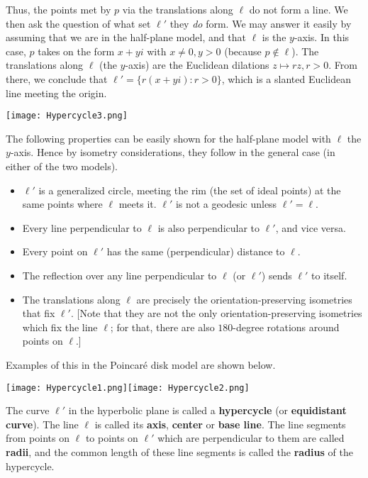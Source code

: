 \documentclass[leqno]{book}
\begin{document}
Thus, the points met by $p$ via the translations along $\ell$ do not form a line.  We then ask the question of what set $\ell'$ they \emph{do} form.  We may answer it easily by assuming that we are in the half-plane model, and that $\ell$ is the $y$-axis.  In this case, $p$ takes on the form $x+yi$ with $x\ne 0,y>0$ (because $p\notin\ell$).  The translations along $\ell$ (the $y$-axis) are the Euclidean dilations $z\mapsto rz,r>0$.  From there, we conclude that $\ell'=\{r(x+yi):r>0\}$, which is a slanted Euclidean line meeting the origin.
\begin{center}\texttt{[image: Hypercycle3.png]}\end{center}
The following properties can be easily shown for the half-plane model with $\ell$ the $y$-axis.  Hence by isometry considerations, they follow in the general case (in either of the two models).
\begin{itemize}
\item $\ell'$ is a generalized circle, meeting the rim (the set of ideal points) at the same points where $\ell$ meets it.  $\ell'$ is not a geodesic unless $\ell'=\ell$. %

\item Every line perpendicular to $\ell$ is also perpendicular to $\ell'$, and vice versa.

\item Every point on $\ell'$ has the same (perpendicular) distance to $\ell$.

\item The reflection over any line perpendicular to $\ell$ (or $\ell'$) sends $\ell'$ to itself.

\item The translations along $\ell$ are precisely the orientation-preserving isometries that fix $\ell'$.  [Note that they are not the only orientation-preserving isometries which fix the line $\ell$; for that, there are also $180$-degree rotations around points on $\ell$.]
\end{itemize}
Examples of this in the Poincar\'e disk model are shown below.
\begin{center}\texttt{[image: Hypercycle1.png]}\texttt{[image: Hypercycle2.png]}\end{center}
The curve $\ell'$ in the hyperbolic plane is called a \textbf{hypercycle} (or \textbf{equidistant curve}).  The line $\ell$ is called its \textbf{axis}, \textbf{center} or \textbf{base line}.  The line segments from points on $\ell$ to points on $\ell'$ which are perpendicular to them are called \textbf{radii}, and the common length of these line segments is called the \textbf{radius} of the hypercycle.
\end{document}
